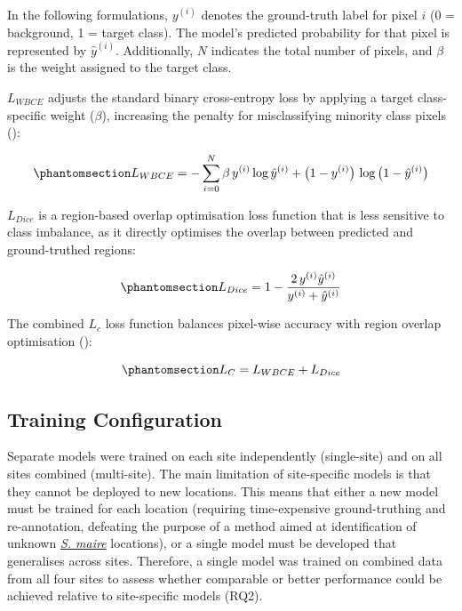 \documentclass[
]{scrreprt}
\begin{document}
In the following formulations, \(y^{(i)}\) denotes the ground-truth
label for pixel \(i\) (0 = background, 1 = target class). The model's
predicted probability for that pixel is represented by
\(\hat{y}^{(i)}\). Additionally, \(N\) indicates the total number of
pixels, and \(\beta\) is the weight assigned to the target class.

\hyperref[acronyms_WBCE]{\(L_{WBCE}\)} adjusts the standard binary
cross-entropy loss by applying a target class-specific weight
(\(\beta\)), increasing the penalty for misclassifying minority class
pixels ():

\begin{equation}\phantomsection\label{eq-WBCE}{
L_{WBCE} = - \sum_{i=0}^{N} \beta\, y^{(i)} \log\hat{y}^{(i)}
+ \big(1 - y^{(i)}\big)\, \log\big(1 - \hat{y}^{(i)}\big)
}\end{equation}

\hyperref[acronyms_DICE]{\(L_{Dice}\)} is a region-based overlap
optimisation loss function that is less sensitive to class imbalance, as
it directly optimises the overlap between predicted and ground-truthed
regions:

\begin{equation}\phantomsection\label{eq-Dice}{
L_{Dice} = 1 - \frac{2\, y^{(i)} \hat{y}^{(i)}}{y^{(i)} + \hat{y}^{(i)}}
}\end{equation}

The combined \hyperref[acronyms_WBCE_D]{\(L_{c}\)} loss function
balances pixel-wise accuracy with region overlap optimisation
():

\begin{equation}\phantomsection\label{eq-WBCE_D}{
L_{C} = L_{WBCE} + L_{Dice}
}\end{equation}

\subsection{Training Configuration}\label{training-configuration}

Separate models were trained on each site independently (single-site)
and on all sites combined (multi-site). The main limitation of
site-specific models is that they cannot be deployed to new locations.
This means that either a new model must be trained for each location
(requiring time-expensive ground-truthing and re-annotation, defeating
the purpose of a method aimed at identification of unknown
\hyperref[acronyms_SM]{\emph{S. maire}} locations), or a single model
must be developed that generalises across sites. Therefore, a single
model was trained on combined data from all four sites to assess whether
comparable or better performance could be achieved relative to
site-specific models (RQ2).
\end{document}
